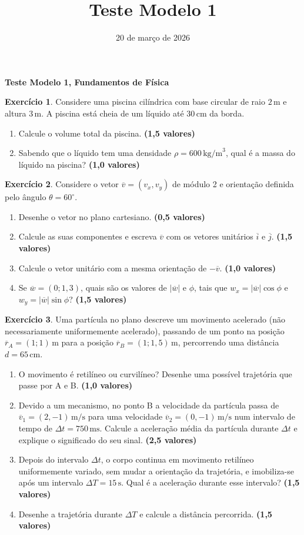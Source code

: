 \documentclass[12pt]{article}
\title{Teste Modelo 1}
\author{}
\date{20 de março de 2026}
\newcommand{\cabecalho}{
	\hfill
	\begin{minipage}[t]{0.7\textwidth}
		\raggedleft
		\textbf{Teste Modelo 1, Fundamentos de Física}
	\end{minipage}
	\vspace{0.5cm}
}
\newcommand{\pontos}[1]{\hfill\textbf{(#1 valores)}}
\begin{document}
	
	\cabecalho
	
	\textbf{Exercício 1}. Considere uma piscina cilíndrica com base circular de raio $2\,\text{m}$ e altura $3\,\text{m}$. A piscina está cheia de um líquido até $30\,\text{cm}$ da borda.
	\begin{enumerate}[label=\textbf{\alph*)}]
		\item Calcule o volume total da piscina. \pontos{1,5}
		\item Sabendo que o líquido tem uma densidade $\rho = 600\,\text{kg/m}^3$, qual é a massa do líquido na piscina? \pontos{1,0}
	\end{enumerate}
	
	\vspace{0.4cm}
	
	\textbf{Exercício 2}. Considere o vetor $\overline{v} = (v_x, v_y)$ de módulo 2 e orientação definida pelo ângulo $\theta = 60^\circ$.
	\begin{enumerate}[label=\textbf{\alph*)}]
		\item Desenhe o vetor no plano cartesiano. \pontos{0,5}
		\item Calcule as suas componentes e escreva $\overline{v}$ com os vetores unitários $\overline{i}$ e $\overline{j}$. \pontos{1,5}
		\item Calcule o vetor unitário com a mesma orientação de $-\overline{v}$. \pontos{1,0}
		\item Se $\overline{w} = (0; 1,3)$, quais são os valores de $|\overline{w}|$ e $\phi$, tais que $w_x = |\overline{w}| \cos \phi$ e $w_y = |\overline{w}| \sin \phi$? \pontos{1,5}
	\end{enumerate}
	
	\vspace{0.4cm}
	
	\textbf{Exercício 3}. Uma partícula no plano descreve um movimento acelerado (não necessariamente uniformemente acelerado), passando de um ponto na posição $\overline{r}_A = (1; 1)\,\text{m}$ para a posição $\overline{r}_B = (1; 1,5)\,\text{m}$, percorrendo uma distância $d = 65\,\text{cm}$.
	\begin{enumerate}[label=\textbf{\alph*)}]
		\item O movimento é retilíneo ou curvilíneo? Desenhe uma possível trajetória que passe por A e B. \pontos{1,0}
		\item Devido a um mecanismo, no ponto B a velocidade da partícula passa de $\overline{v}_1 = (2, -1)\,\text{m/s}$ para uma velocidade $\overline{v}_2 = (0, -1)\,\text{m/s}$ num intervalo de tempo de $\Delta t = 750\,\text{ms}$. Calcule a aceleração média da partícula durante $\Delta t$ e explique o significado do seu sinal. \pontos{2,5}
		\item Depois do intervalo $\Delta t$, o corpo continua em movimento retilíneo uniformemente variado, sem mudar a orientação da trajetória, e imobiliza-se após um intervalo $\Delta T = 15\,\text{s}$. Qual é a aceleração durante esse intervalo? \pontos{1,5}
		\item Desenhe a trajetória durante $\Delta T$ e calcule a distância percorrida. \pontos{1,5}
	\end{enumerate}
	
\end{document}

